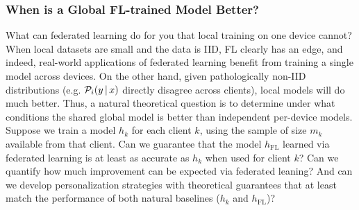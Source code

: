 \documentclass[11pt]{article}
\begin{document}
\newcommand{\hFL}{h_{\text{FL}}}
\subsubsection{When is a Global FL-trained Model Better?}
What can federated learning do for you that local training on one device cannot? When local datasets are small and the data is IID, FL clearly has an edge, and indeed, real-world applications of federated learning \cite{yang18gboardquery, hard18gboard, chen19oov} benefit from training a single model across devices. On the other hand, given pathologically non-IID distributions (e.g. $\mathcal{P}_i(y \,|\, x)$ directly disagree across clients), local models will do much better. Thus, a natural theoretical question is to determine under what conditions the shared global model is better than independent per-device models. Suppose we train a model $h_k$ for each client $k$, using the sample of size $m_k$ available from that client. Can we guarantee that the model $\hFL$ learned via federated learning is at least as accurate as $h_k$ when used for client $k$?
Can we quantify how much improvement can be expected via federated leaning?
And can we develop personalization strategies with theoretical guarantees that at least match the performance of both natural baselines ($h_k$ and $\hFL$)?
\end{document}
